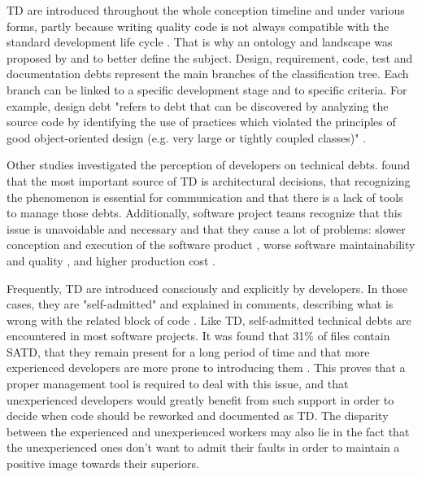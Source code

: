 \ac{TD} are introduced throughout the whole conception timeline and under various forms, partly because writing quality code is not always compatible with the standard development life cycle \citep{brown2010managing}. That is why an ontology and landscape was proposed by \citet{alves2014towards} and \citet{izurieta2012organizing} to better define the subject. Design, requirement, code, test and documentation debts represent the main branches of the classification tree. Each branch can be linked to a specific development stage and to specific criteria. For example, design debt "refers to debt that can be discovered by analyzing the source code by identifying the use of practices which violated the principles of good object-oriented design (e.g. very large or tightly coupled classes)" \citep{alves2014towards}. \par

Other studies investigated the perception of developers on technical debts. \citet{Ernst:2015:MMI:2786805.2786848} found that the most important source of \ac{TD} is architectural decisions, that recognizing the phenomenon is essential for communication and that there is a lack of tools to manage those debts. Additionally, software project teams recognize that this issue is unavoidable and necessary \citep{lim2012balancing} and that they cause a lot of problems: slower conception and execution of the software product \citep{allman2012managing}, worse software maintainability and quality \citep{wehaibi2016examining,zazworka2011investigating}, and higher production cost \citep{guo2011tracking}. \par

Frequently, \ac{TD} are introduced consciously and explicitly by developers. In those cases, they are "self-admitted" and explained in comments, describing what is wrong with the related block of code \citep{PotdarS14}. Like \ac{TD}, self-admitted technical debts are encountered in most software projects. It was found that 31\% of files contain \ac{SATD}, that they remain present for a long period of time and that more experienced developers are more prone to introducing them \citep{PotdarS14}. This proves that a proper management tool is required to deal with this issue, and that unexperienced developers would greatly benefit from such support in order to decide when code should be reworked and documented as \ac{TD}. The disparity between the experienced and unexperienced workers may also lie in the fact that the unexperienced ones don't want to admit their faults in order to maintain a positive image towards their superiors. \par

